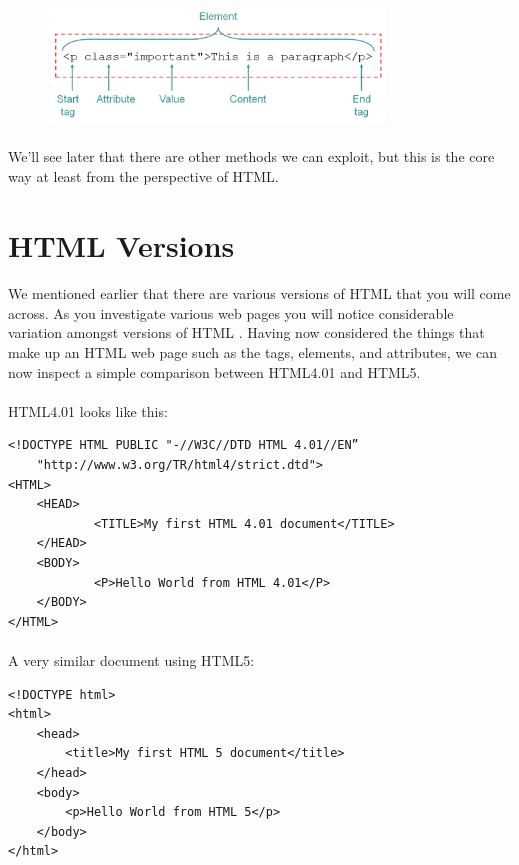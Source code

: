 \begin{figure}[H]
\centering
\includegraphics[width=0.8\textwidth]{figures/html-structure}
\label{fig:html-structure}
\end{figure}

\paragraph{} We'll see later that there are other methods we can exploit, but this is the core way at least from the perspective of HTML.

\section{HTML Versions}
\paragraph{} We mentioned earlier that there are various versions of HTML that you will come across. As you investigate various web pages you will notice considerable variation amongst versions of HTML . Having now considered the things that make up an HTML web page such as the tags, elements, and attributes, we can now inspect a simple comparison between HTML4.01 and HTML5.
\paragraph{} HTML4.01 looks like this:
\begin{lstlisting}
<!DOCTYPE HTML PUBLIC "-//W3C//DTD HTML 4.01//EN” 
	"http://www.w3.org/TR/html4/strict.dtd">
<HTML>
 	<HEAD>
      		<TITLE>My first HTML 4.01 document</TITLE>
  	</HEAD>
   	<BODY>
      		<P>Hello World from HTML 4.01</P>
   	</BODY>
</HTML>
\end{lstlisting}
\paragraph{} A very similar document using HTML5:
\begin{lstlisting}
<!DOCTYPE html>
<html>
	<head>
		<title>My first HTML 5 document</title>
	</head>
	<body>
		<p>Hello World from HTML 5</p>
	</body>
</html>
\end{lstlisting}
